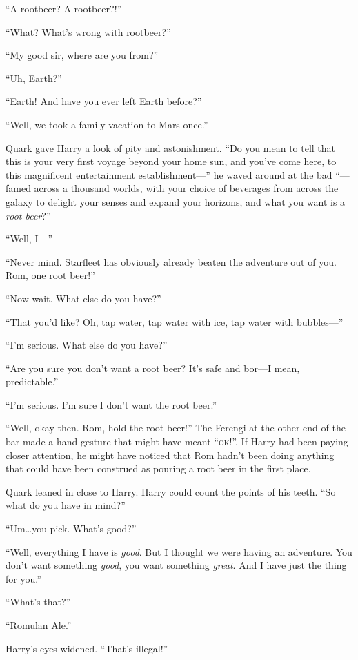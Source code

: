 \documentclass[twoside,letterpaper,12pt]{memoir}
\begin{document}
``A rootbeer? A rootbeer?!''

``What? What's wrong with rootbeer?''

``My good sir, where are you from?''

``Uh, Earth?''

``Earth! And have you ever left Earth before?''

``Well, we took a family vacation to Mars once.''

Quark gave Harry a look of pity and astonishment. ``Do you mean to tell that this is your very first voyage beyond your home sun, and you've come here, to this magnificent entertainment establishment---'' he waved around at the bad ``---famed across a thousand worlds, with your choice of beverages from across the galaxy to delight your senses and expand your horizons, and what you want is a \textit{root beer}?''

``Well, I---''

``Never mind. Starfleet has obviously already beaten the adventure out of you. Rom, one root beer!''

``Now wait. What else do you have?''

``That you'd like? Oh, tap water, tap water with ice, tap water with bubbles---''

``I'm serious. What else do you have?''

``Are you sure you don't want a root beer? It's safe and bor---I mean, predictable.''

``I'm serious. I'm sure I don't want the root beer.''

``Well, okay then. Rom, hold the root beer!'' The Ferengi at the other end of the bar made a hand gesture that might have meant ``\textsc{ok}!''. If Harry had been paying closer attention, he might have noticed that Rom hadn't been doing anything that could have been construed as pouring a root beer in the first place.

Quark leaned in close to Harry. Harry could count the points of his teeth. ``So what do you have in mind?''

``Um\ldots you pick. What's good?''

``Well, everything I have is \textit{good}. But I thought we were having an adventure. You don't want something \textit{good}, you want something \textit{great}. And I have just the thing for you.''

``What's that?''

``Romulan Ale.''

Harry's eyes widened. ``That's illegal!''
\end{document}
